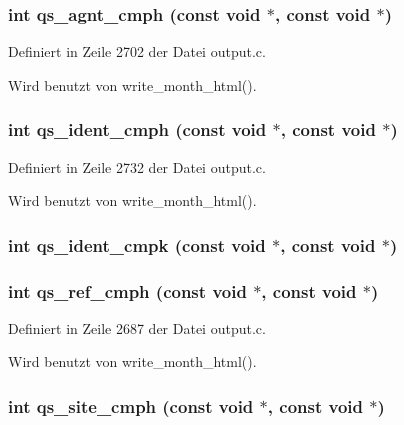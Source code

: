 \subsubsection{\setlength{\rightskip}{0pt plus 5cm}int qs\_\-agnt\_\-cmph (const void $\ast$, const void $\ast$)}\label{output_8c_72a92b6a4155e75b035247485efacd27}




Definiert in Zeile 2702 der Datei output.c.

Wird benutzt von write\_\-month\_\-html().
\subsubsection{\setlength{\rightskip}{0pt plus 5cm}int qs\_\-ident\_\-cmph (const void $\ast$, const void $\ast$)}\label{output_8c_ab10c25bdfd5abd8dda51817fa9027cd}




Definiert in Zeile 2732 der Datei output.c.

Wird benutzt von write\_\-month\_\-html().
\subsubsection{\setlength{\rightskip}{0pt plus 5cm}int qs\_\-ident\_\-cmpk (const void $\ast$, const void $\ast$)}\label{output_8c_629673e2af2406711232e87efa863b16}


\subsubsection{\setlength{\rightskip}{0pt plus 5cm}int qs\_\-ref\_\-cmph (const void $\ast$, const void $\ast$)}\label{output_8c_9fcda824a6cb67eea93f6c873ce382e2}




Definiert in Zeile 2687 der Datei output.c.

Wird benutzt von write\_\-month\_\-html().
\subsubsection{\setlength{\rightskip}{0pt plus 5cm}int qs\_\-site\_\-cmph (const void $\ast$, const void $\ast$)}\label{output_8c_322ce92d71bc2e3c8d61c5edfa937b66}




